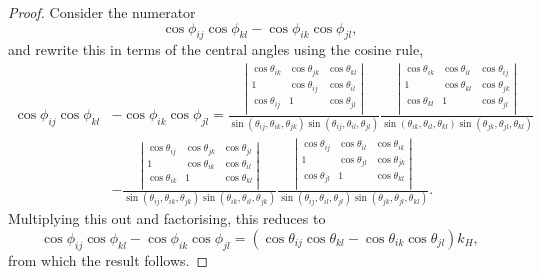 \documentclass[10pt,a4paper]{amsart}
\begin{document}
\begin{proof}
Consider the numerator
\begin{equation}
\cos\phi_{ij}\cos\phi_{kl}-\cos\phi_{ik}\cos\phi_{jl},
\end{equation}
and rewrite this in terms of the central angles using the cosine rule,
\begin{equation}
\begin{split}
\cos\phi_{ij}\cos\phi_{kl}&-\cos\phi_{ik}\cos\phi_{jl}=
\frac{\left|\begin{array}{ccc}
\cos\theta_{ik} & \cos\theta_{jk} & \cos\theta_{kl}\\
1 & \cos\theta_{ij} & \cos\theta_{il}\\
\cos\theta_{ij} & 1 & \cos\theta_{jl}\\
\end{array}\right|}
{\sin(\theta_{ij},\theta_{ik},\theta_{jk})\sin(\theta_{ij},\theta_{il},\theta_{jl})}
\frac{\left|\begin{array}{ccc}
\cos\theta_{ik} & \cos\theta_{il} & \cos\theta_{ij}\\
1 & \cos\theta_{kl} & \cos\theta_{jk}\\
\cos\theta_{kl} & 1 & \cos\theta_{jl}\\
\end{array}\right|}
{\sin(\theta_{ik},\theta_{il},\theta_{kl})\sin(\theta_{jk},\theta_{jl},\theta_{kl})}\\
&-
\frac{\left|\begin{array}{ccc}
\cos\theta_{ij} & \cos\theta_{jk} & \cos\theta_{jl}\\
1 & \cos\theta_{ik} & \cos\theta_{il}\\
\cos\theta_{ik} & 1 & \cos\theta_{kl}\\
\end{array}\right|}
{\sin(\theta_{ij},\theta_{ik},\theta_{jk})\sin(\theta_{ik},\theta_{il},\theta_{jk})}
\frac{\left|\begin{array}{ccc}
\cos\theta_{ij} & \cos\theta_{il} & \cos\theta_{ik}\\
1 & \cos\theta_{jl} & \cos\theta_{jk}\\
\cos\theta_{jl} & 1 & \cos\theta_{kl}\\
\end{array}\right|}
{\sin(\theta_{ij},\theta_{il},\theta_{jl})\sin(\theta_{jk},\theta_{jl},\theta_{kl})}.
\end{split}
\end{equation}
Multiplying this out and factorising, this reduces to
\begin{equation}
\cos\phi_{ij}\cos\phi_{kl}-\cos\phi_{ik}\cos\phi_{jl}=(\cos\theta_{ij}\cos\theta_{kl}-\cos\theta_{ik}\cos\theta_{jl})k_H,
\end{equation}
from which the result follows.
\end{proof}
\end{document}
